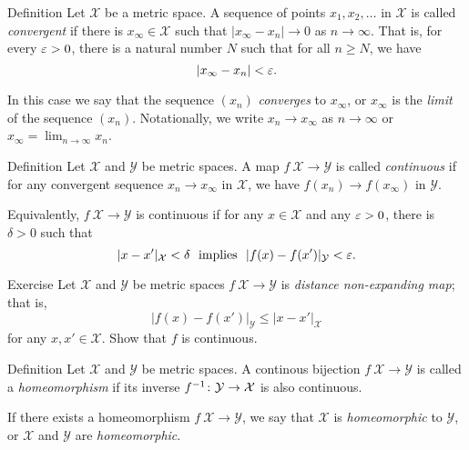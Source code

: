 \begin{thm}{Definition}
 Let ${\mathcal X}$ be a metric space.
A sequence of points $x_1, x_2, \ldots$ in ${\mathcal X}$ is called \emph{convergent}
if there is 
$x_\infty\in {\mathcal X}$ such that $|x_\infty -x_n|\to 0$ as $n\to\infty$.  
That is, for every $\varepsilon > 0$, there is a natural number $N$ such that for all $n \ge N$, we have $$|x_\infty-x_n| < \varepsilon.$$

In this case we say that the sequence $(x_n)$ \emph{converges} to $x_\infty$, 
or $x_\infty$ is the \emph{limit} of the sequence $(x_n)$.
Notationally, we write $x_n\to x_\infty$ as $n\to\infty$
or $x_\infty=\lim_{n\to\infty} x_n$.
\end{thm}

\begin{thm}{Definition}
Let ${\mathcal X}$ and ${\mathcal Y}$ be metric spaces.
A map $f\:{\mathcal X}\to {\mathcal Y}$ is called \emph{continuous} if for any convergent sequence $x_n\to x_\infty$ in ${\mathcal X}$,
we have $f(x_n) \to f(x_\infty)$ in ${\mathcal Y}$.

Equivalently, $f\:{\mathcal X}\to {\mathcal Y}$ is continuous if for any $x\in {\mathcal X}$ and any $\varepsilon>0$,
there is $\delta>0$ such that 
$$|x-x'|_{\mathcal X}<\delta\ \text{ implies }\ |f(x)-f(x')|_{\mathcal Y}<\eps.$$

\end{thm}

\begin{thm}{Exercise}
Let ${\mathcal X}$ and ${\mathcal Y}$ be metric spaces $f\:{\mathcal X}\to {\mathcal Y}$ is \emph{distance non-expanding map}; that is, 
\[|f(x)-f(x')|_{\mathcal Y}\le |x-x'|_{\mathcal X}\]
for any $x,x'\in \mathcal X$.
Show that $f$ is continuous.
\end{thm}

\begin{thm}{Definition}
Let ${\mathcal X}$ and ${\mathcal Y}$ be metric spaces.
A continous bijection $f\:{\mathcal X}\to {\mathcal Y}$ 
is called a \emph{homeomorphism} 
if its inverse $f^{-1}\:{\mathcal Y}\z\to {\mathcal X}$ is also continuous.

If there exists a homeomorphism $f\:{\mathcal X}\to {\mathcal Y}$,
we say that ${\mathcal X}$ is \emph{homeomorphic} to ${\mathcal Y}$,
or  $\mathcal X$ and ${\mathcal Y}$ are \emph{homeomorphic}.
\end{thm}

